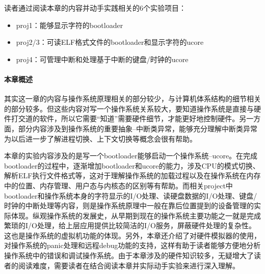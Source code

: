 读者通过阅读本章的内容并动手实践相关的6个实验项目：

\begin{itemize}
	\item
	proj1：能够显示字符的bootloader
	\item
	proj2/3：可读ELF格式文件的bootloader和显示字符的ucore
	\item
	proj4：可管理中断和处理基于中断的键盘/时钟的ucore
\end{itemize}

\paragraph{本章概述}

其实这一章的内容与操作系统原理相关的部分较少，与计算机体系结构的细节相关的部分较多。但这些内容对写一个操作系统关系较大，要知道操作系统是直接与硬件打交道的软件，所以它需要``知道''需要硬件细节，才能更好地控制硬件。另一方面，部分内容涉及到操作系统的重要抽象--中断类异常，能够充分理解中断类异常为以后进一步了解进程切换、上下文切换等概念会很有帮助。

本章的实验内容涉及的是写一个bootloader能够启动一个操作系统--ucore。在完成bootloader的过程中，逐渐增加bootloader和ucore的能力，涉及CPU的模式切换、解析ELF执行文件格式等，这对于理解操作系统的加载过程以及在操作系统在内存中的位置、内存管理、用户态与内核态的区别等有帮助。而相关project中bootloader和操作系统本身的字符显示的I/O处理、读硬盘数据的I/O处理、键盘/时钟的中断处理等内容，则是操作系统原理中一般在靠后位置提到的设备管理的实际体现。纵观操作系统的发展史，从早期到现在的操作系统主要功能之一就是完成繁琐的I/O处理，给上层应用提供比较简洁的I/O服务，屏蔽硬件处理的复杂性。这也是操作系统的虚拟机功能的体现。另外，本章还介绍了对硬件模拟器的使用，对操作系统的panic处理和远程debug功能的支持，这样有助于读者能够方便地分析操作系统中的错误和调试操作系统。由于本章涉及的硬件知识较多，无疑增大了读者的阅读难度，需要读者在结合阅读本章并实际动手实验来进行深入理解。